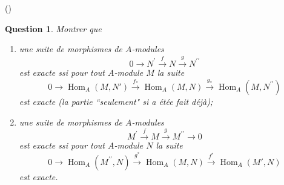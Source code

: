 \documentclass[]{article}
\newtheorem{prop}{Question}
\theoremstyle{remark}
\begin{document}
{()}
\begin{prop}
	Montrer que
	\begin{enumerate}
		\item  une suite de morphismes de $A$-modules \[ 0 \longrightarrow N^{\prime} \stackrel{f}{\longrightarrow} N \stackrel{g}{\longrightarrow} N^{\prime \prime} \] est exacte ssi pour tout $A$-module $M$ la suite \[ 0 \longrightarrow \operatorname{Hom}_{A}(M, N') \stackrel{f_*}{\longrightarrow} \operatorname{Hom}_{A}\left(M, N\right) \stackrel{g_*}{\longrightarrow} \operatorname{Hom}_{A}\left(M, N^{\prime \prime}\right) \] est exacte (la partie ``seulement" si a étée fait déjà);
		\item une suite de morphismes de $A$-modules \[ M^{\prime} \stackrel{f}{\longrightarrow} M \stackrel{g}{\longrightarrow} M^{\prime \prime} \longrightarrow 0 \]
		est exacte ssi pour tout $A$-module $N$ la suite \[ 0 \longrightarrow \operatorname{Hom}_{A}\left(M^{\prime \prime}, N\right) \stackrel{g^{*}}{\longrightarrow} \operatorname{Hom}_{A}\left(M, N\right) \stackrel{f^{*}}{\longrightarrow} \operatorname{Hom}_{A}(M', N) \] est exacte.
	\end{enumerate}
\end{prop}
\end{document}
